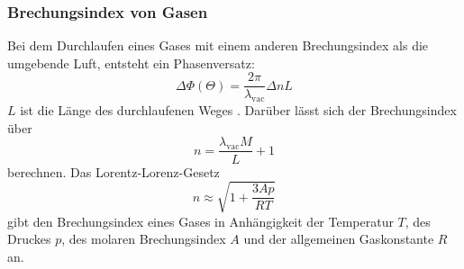 \subsubsection{Brechungsindex von Gasen}
Bei dem Durchlaufen eines Gases mit einem anderen Brechungsindex als die umgebende Luft,
entsteht ein Phasenversatz:
\begin{equation}
\Delta \Phi(\Theta)=\frac{2\pi}{\lambda_{\text{vac}}} \Delta n L
\label{eq:pM2}
\end{equation}
$L$ ist die Länge des durchlaufenen Weges \cite{V64}.
Darüber lässt sich der Brechungsindex über
\begin{equation}
  \label{eqn:n_luft}
  n = \frac{\lambda_{\text{vac}} M }{L} + 1
\end{equation}
\noindent berechnen.
\newline \newline
\noindent Das Lorentz-Lorenz-Gesetz
\begin{equation}
  n \approx \sqrt{1+ \frac{3Ap}{RT}}
  \label{eqn:lorentz}
\end{equation}
gibt den Brechungsindex eines Gases in Anhängigkeit der Temperatur $T$,
des Druckes $p$, des molaren Brechungsindex $A$ 
und der allgemeinen Gaskonstante $R$ an.
